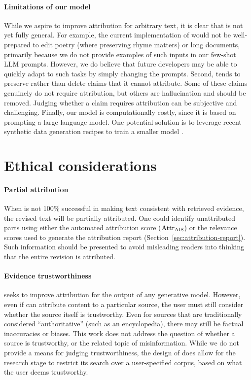 \documentclass[11pt]{article}
\begin{document}
\paragraph{Limitations of our model}
While we aspire to improve attribution for arbitrary text, it is clear that \approach{} is not yet fully general. For example, the current implementation of \approach{} would not be well-prepared to edit poetry (where preserving rhyme matters) or long documents, primarily because we do not provide examples of such inputs in our few-shot LLM prompts. However, we do believe that future developers may be able to quickly adapt \approach{} to such tasks by simply changing the prompts. Second, \approach{} tends to preserve rather than delete claims that it cannot attribute. Some of these claims genuinely do not require attribution, but others are hallucination and should be removed. Judging whether a claim requires attribution can be subjective and challenging. Finally, our model is computationally costly, since it is based on prompting a large language model. One potential solution is to leverage recent synthetic data generation recipes to train a smaller model \cite{lee2021neural,Schick2022PEER}.

\section{Ethical considerations}

\paragraph{Partial attribution}
When \approach{} is not 100\% successful in making text consistent with retrieved evidence, the revised text will be partially attributed.
One could identify unattributed parts using either the automated attribution score ($\text{Attr}_\text{AIS}{}$) or the relevance scores used to generate the attribution report (Section~\ref{sec:attribution-report}).
Such information should be presented to avoid misleading readers into thinking that the entire revision is attributed.

\paragraph{Evidence trustworthiness}
\approach{} seeks to improve attribution for the output of any generative model. However, even if \approach{} can attribute content to a particular source, the user must still consider whether the source itself is trustworthy. Even for sources that are traditionally considered ``authoritative'' (such as an encyclopedia), there may still be factual inaccuracies or biases. This work does not address the question of whether a source is trustworthy, or the related topic of misinformation.
While we do not provide a means for judging trustworthiness, the design of \approach{} does allow for the research stage to restrict its search over a user-specified corpus, based on what the user deems trustworthy.
\end{document}
